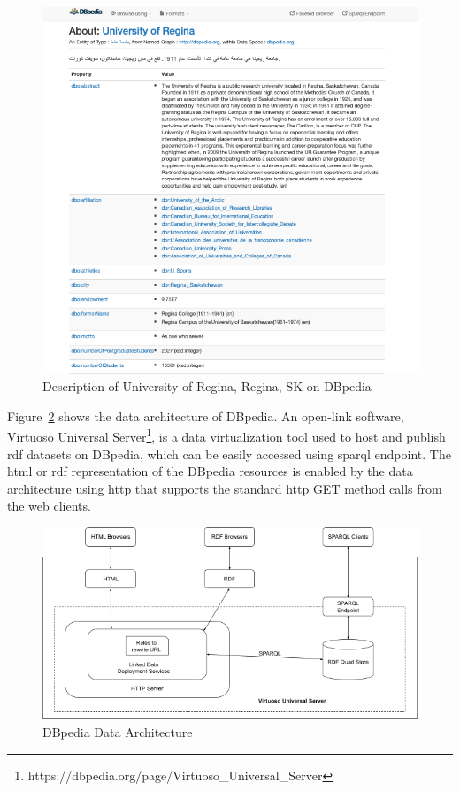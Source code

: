 \begin{doublespace}
\begin{figure}[htp]
\centering
    \includegraphics[width=15cm]{images/ch2/Figure18.png}
    \caption{Description of University of Regina, Regina, SK on DBpedia}
    \label{fig:2.18}
\end{figure}
\par Figure~\ref{fig:2.19} shows the data architecture of DBpedia. An open-link software, Virtuoso Universal Server\footnote{https://dbpedia.org/page/Virtuoso\_Universal\_Server}, is a data virtualization tool used to host and publish \ac{rdf} datasets on DBpedia, which can be easily accessed using \ac{sparql} endpoint. The \ac{html} or \ac{rdf} representation of the DBpedia resources is enabled by the data architecture using \ac{http} that supports the standard \ac{http} GET method calls from the web clients.
\begin{figure}[htp]
    \centering
    \includegraphics[width=15cm]{images/ch2/Figure19.png}
    \caption{DBpedia Data Architecture}
    \label{fig:2.19}
\end{figure}
\end{doublespace}



